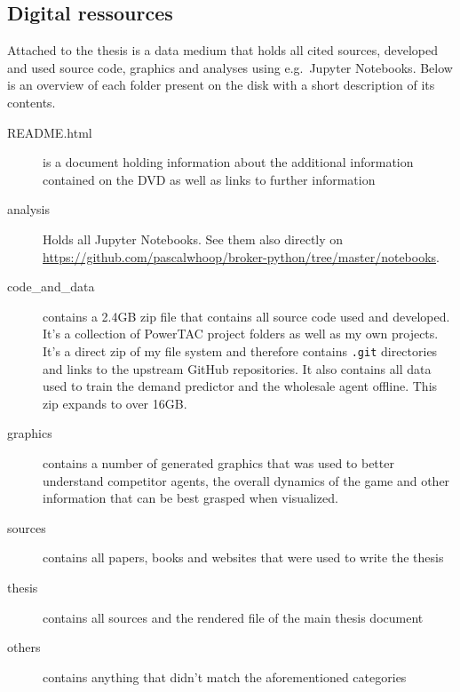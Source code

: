 \newpage
{}
\begin{appendices}
    \section{Digital ressources}
    Attached to the thesis is a data medium that holds all cited sources, developed and used source code, graphics and
    analyses using e.g.\ Jupyter Notebooks. Below is an overview of each folder present on the disk with a short description
    of its contents.

    \begin{description}
        \item[README.html] is a document holding information about the additional information contained on the DVD as well
            as links to further information
        \item[analysis] Holds all Jupyter Notebooks. See them also directly on
            \url{https://github.com/pascalwhoop/broker-python/tree/master/notebooks}.
        \item[code\_and\_data] contains a 2.4GB zip file that contains all source code used and developed. It's a collection of \ac{PowerTAC}
            project folders as well as my own projects. It's a direct zip of my file system and therefore contains \texttt{.git}
            directories and links to the upstream GitHub repositories. It also contains all data used to train the demand predictor
            and the wholesale agent offline. This zip expands to over 16GB.
        \item[graphics] contains a number of generated graphics that was used to better understand competitor agents, the
            overall dynamics of the game and other information that can be best grasped when visualized.
        \item[sources] contains all papers, books and websites that were used to write the thesis
        \item[thesis] contains all sources and the rendered  file of the main thesis document
        \item[others] contains anything that didn't match the aforementioned categories
    \end{description}
\end{appendices}

